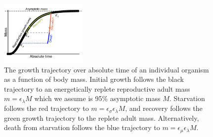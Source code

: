 \documentclass[twocolumn,preprintnumbers,amsmath,amssymb,superscriptaddress]{revtex4}
\begin{document}
\begin{figure}
\includegraphics[width=0.375\textwidth]{Growth-trajectory-diagram.pdf}
\caption{\small The growth trajectory over absolute time of an individual
  organism as a function of body mass.  Initial growth follows the black
  trajectory to an energetically replete reproductive adult mass
  $m=\epsilon_\lambda M$ which we assume is 95\% asymptotic mass $M$.
  Starvation follows the red trajectory to
  $m = \epsilon_\sigma \epsilon_\lambda M$, and recovery follows the green
  growth trajectory to the replete adult mass. Alternatively, death from
  starvation follows the blue trajectory to
  $m=\epsilon_\mu \epsilon_\lambda M$.}
\label{fig:growth}
\end{figure}
\end{document}
